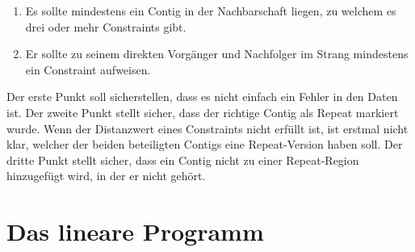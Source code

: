 \begin{enumerate}
\item Es sollte mindestens ein Contig in der Nachbarschaft liegen, zu welchem es drei oder mehr Constraints gibt.
\item Er sollte zu seinem direkten Vorgänger und Nachfolger im Strang mindestens ein Constraint aufweisen.
\end{enumerate}
Der erste Punkt soll sicherstellen, dass es nicht einfach ein Fehler in den Daten ist. Der zweite Punkt stellt sicher, dass der richtige Contig als Repeat markiert wurde. Wenn der Distanzwert eines Constraints nicht erfüllt ist, ist erstmal nicht klar, welcher der beiden beteiligten Contigs eine Repeat-Version haben soll. Der dritte Punkt stellt sicher, dass ein Contig nicht zu einer Repeat-Region hinzugefügt wird, in der er nicht gehört.

\section{Das lineare Programm}

